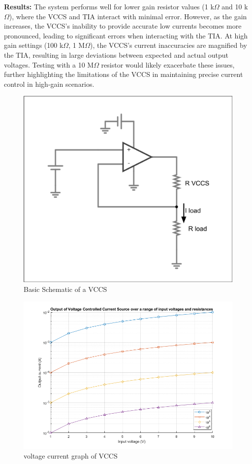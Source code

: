 \documentclass[conference]{IEEEtran}
\begin{document}
\textbf{Results:} The system performs well for lower gain resistor values (1 k$\Omega$ and 10 k$\Omega$), where the VCCS and TIA interact with minimal error. However, as the gain increases, the VCCS’s inability to provide accurate low currents becomes more pronounced, leading to significant errors when interacting with the TIA. At high gain settings (100 k$\Omega$, 1 M$\Omega$), the VCCS’s current inaccuracies are magnified by the TIA, resulting in large deviations between expected and actual output voltages. Testing with a 10 M$\Omega$ resistor would likely exacerbate these issues, further highlighting the limitations of the VCCS in maintaining precise current control in high-gain scenarios.

\begin{figure}
    \centering
    \includegraphics[width=\linewidth]{VCCS_schematic.png}
    \caption{Basic Schematic of a VCCS}
    \label{fig:9}
\end{figure}

\begin{figure}
    \centering
    \includegraphics[width=\linewidth]{VCCSplot.png}
    \caption{voltage current graph of VCCS}
    \label{fig:10}
\end{figure}
\end{document}
